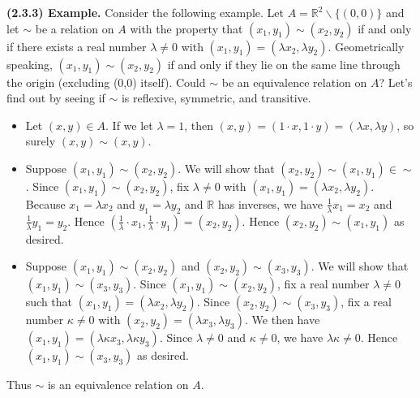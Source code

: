 \documentclass[12pt]{book}
\def\R{{\mathbb{R}}}
\begin{document}
\noindent\textbf{(2.3.3) Example.} Consider the following example. Let $A=\R^2\backslash\{(0,0)\}$ and let $\sim$ be a relation on $A$ with the property that $(x_1,y_1)\sim(x_2,y_2)$ if and only if there exists a real number $\lambda\neq 0$ with $(x_1,y_1)=(\lambda x_2,\lambda y_2)$. Geometrically speaking, $(x_1,y_1)\sim(x_2,y_2)$ if and only if they lie on the same line through the origin (excluding (0,0) itself). Could $\sim$ be an equivalence relation on $A$? Let's find out by seeing if $\sim$ is reflexive, symmetric, and transitive. 
\begin{itemize}
\item Let $(x,y)\in A$. If we let $\lambda=1$, then $(x,y)=(1\cdot x,1\cdot y)=(\lambda x,\lambda y)$, so surely $(x,y)\sim(x,y)$.
\item Suppose $(x_1,y_1)\sim(x_2,y_2)$. We will show that $(x_2,y_2)\sim(x_1,y_1)\in \sim$. Since $(x_1,y_1)\sim(x_2,y_2)$, fix $\lambda\neq 0$ with $(x_1,y_1)=(\lambda x_2,\lambda y_2)$. Because $x_1=\lambda x_2$ and $y_1=\lambda y_2$ and $\R$ has inverses, we have $\frac{1}{\lambda}x_1=x_2$ and $\frac{1}{\lambda}y_1=y_2$. Hence $(\frac{1}{\lambda}\cdot x_1,\frac{1}{\lambda}\cdot y_1)=(x_2,y_2)$. Hence $(x_2,y_2)\sim(x_1,y_1)$ as desired.
\item Suppose $(x_1,y_1)\sim(x_2,y_2)$ and $(x_2,y_2)\sim(x_3,y_3)$. We will show that $(x_1,y_1)\sim(x_3,y_3)$. Since $(x_1,y_1)\sim(x_2,y_2)$, fix a real number $\lambda\neq 0$ such that $(x_1,y_1)=(\lambda x_2,\lambda y_2)$. Since $(x_2,y_2)\sim(x_3,y_3)$, fix a real number $\kappa\neq 0$ with $(x_2,y_2)=(\lambda x_3,\lambda y_3)$. We then have $(x_1,y_1)=(\lambda\kappa x_3,\lambda\kappa y_3)$. Since $\lambda\neq 0$ and $\kappa\neq 0$, we have $\lambda\kappa\neq 0$. Hence $(x_1,y_1)\sim(x_3,y_3)$ as desired.
\end{itemize}
Thus $\sim$ is an equivalence relation on $A$.\\
\end{document}
